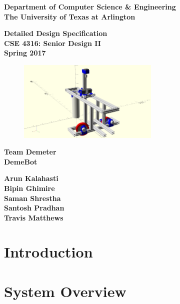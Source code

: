 \documentclass[11pt,letterpaper]{article}
\newcommand{\teamname}{Team Demeter}
\newcommand{\productname}{DemeBot}
\newcommand{\coursename}{CSE 4316: Senior Design II}
\newcommand{\semester}{Spring 2017}
\newcommand{\docname}{Detailed Design Specification}
\newcommand{\department}{Department of Computer Science \& Engineering}
\newcommand{\university}{The University of Texas at Arlington}
\newcommand{\authors}{Arun Kalahasti \\ Bipin Ghimire \\ Saman Shrestha \\ Santosh Pradhan \\ Travis Matthews}
\begin{document}
{\centering \huge \color{accentcolor} \sc \textbf{\department \\ \university} \par}
\vspace{1 in}
{\centering \huge \color{accentcolor} \sc \textbf{\docname \\ \coursename \\ \semester} \par}
\vspace{0.5 in}
\begin{figure}[h!]
	\centering
   	\includegraphics[width=0.60\textwidth]{images/detailed}
\end{figure}
\vspace{0.5 in}
{\centering \huge \color{accentcolor} \sc \textbf{\teamname \\ \productname} \par}
\vspace{0.5 in}
{\centering \large \sc \textbf{\authors} \par}
\newpage



\begin{versionhistory}
\end{versionhistory}
\newpage

\setcounter{tocdepth}{2}
\tableofcontents
\newpage

\listoffigures
\listoftables
\newpage

\section{Introduction}

\newpage
\section{System Overview}

\newpage
\end{document}
